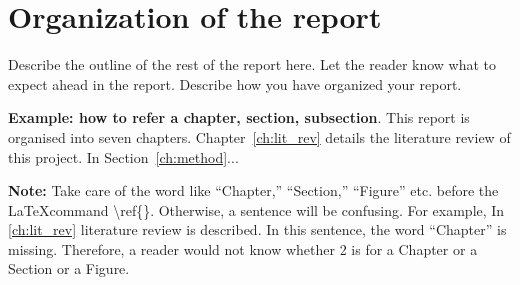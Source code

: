 \section{Organization of the report} %
\label{sec:intro_org} %
Describe the outline of the rest of the report here. Let the reader know what to expect ahead 
in the report. Describe how you have organized your report. 

\textbf{Example: how to refer a chapter, section, subsection}. This report is organised into 
seven chapters. Chapter~\ref{ch:lit_rev} details the literature review of this project. In 
Section~\ref{ch:method}...  %

\textbf{Note:}  Take care of the word like ``Chapter,'' ``Section,'' ``Figure'' etc. before the 
\LaTeX command \textbackslash ref\{\}. Otherwise, a  sentence will be confusing. For example, 
In \ref{ch:lit_rev} literature review is described. In this sentence, the word ``Chapter'' is 
missing. Therefore, a reader would not know whether 2 is for a Chapter or a Section or a Figure.

